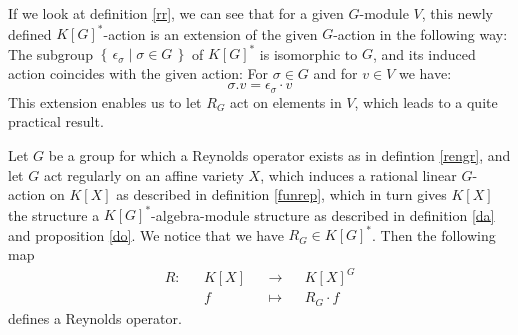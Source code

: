   If we look at definition \ref{rr}, we can see that for a given $G$-module $V$, this newly defined $K[G]^\ast$-action is an extension of the given $G$-action in the following way:
  The subgroup $\left\{\, \epsilon_\sigma \mid \sigma \in G \,\right\}$ of $K[G]^\ast$ is isomorphic to $G$, and its induced action coincides with the given action:
  For $\sigma \in G$ and for $v \in V$ we have:
  \begin{equation}
    \sigma . v = \epsilon_\sigma \cdot v
  \end{equation}
This extension enables us to let $R_G$ act on elements in $V$, which leads to a quite practical result. 

\begin{theorem}\label{ro}
  Let $G$ be a group for which a Reynolds operator exists as in defintion \ref{rengr}, and let $G$ act regularly on an affine variety $X$, which induces a rational linear $G$-action on $K[X]$ as described in definition \ref{funrep}, which in turn gives $K[X]$ the structure a $K[G]^\ast$-algebra-module structure as described in definition \ref{da} and proposition \ref{do}.
  We notice that we have $R_G \in K[G]^\ast$.
  Then the following map
  \begin{equation}
    \begin{aligned}
      R \colon &&K[X] &&\longrightarrow&& K[X]^G  \\
      && f&& \longmapsto&& R_G \cdot f
    \end{aligned}
  \end{equation}
  defines a Reynolds operator.
\end{theorem}

